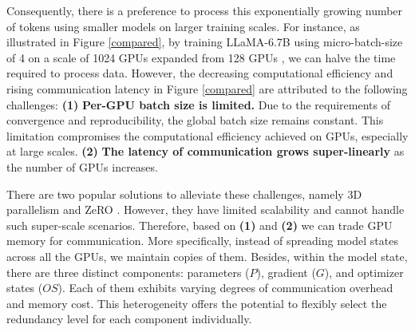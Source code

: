 Consequently, there is a preference to process this exponentially growing number of tokens using smaller models on larger training scales. For instance, as illustrated in Figure \ref{compared}, by training LLaMA-6.7B using micro-batch-size of 4 on a scale of 1024 GPUs \cite{LLaMA,Llama2} expanded from 128 GPUs \cite{Megatron-LM,ZeRO,PyTorchFSDP}, we can halve the time \cite{LLaMA,trainingcomputeoptimal} required to process data. 
However, the decreasing computational efficiency and rising communication latency in Figure \ref{compared} are attributed to the following challenges:
{\bfseries (1)} \textbf{Per-GPU batch size is limited.} Due to the requirements of convergence and reproducibility, the global batch size remains constant. This limitation compromises the computational efficiency achieved on GPUs, especially at large scales.
{\bfseries (2)} \textbf{The latency of communication grows super-linearly} as the number of GPUs increases. 

There are two popular solutions to alleviate these challenges, namely 3D parallelism \cite{Megatron-LM,Megatron-LM1,Alpa} and ZeRO \cite{ZeRO,ZeRO++,ZeRO-Infinity}. However, they have limited scalability and cannot handle such super-scale scenarios.
Therefore, based on \textbf{(1)} and \textbf{(2)} we can trade GPU memory for communication. More specifically, instead of spreading model states across all the GPUs, we maintain copies of them. Besides, within the model state, there are three distinct components: parameters ($P$), gradient ($G$), and optimizer states ($OS$). Each of them exhibits varying degrees of communication overhead and memory cost. This heterogeneity offers the potential to flexibly select the redundancy level for each component individually. 




